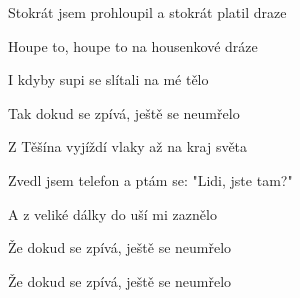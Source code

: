\begin{song}
Stokrát jsem prohloupil a stokrát platil draze    \par
{}Houpe to, houpe to na housenkové dráze    \par
{}I kdyby supi se slítali na mé tělo \par
Tak dokud se zpívá, ještě se neumřelo    \par

\bigskip

Z Těšína vyjíždí vlaky až na kraj světa    \par
{}Zvedl jsem telefon a ptám se: "Lidi, jste tam?"    \par
A z veliké dálky do uší mi zaznělo \par
Že dokud se zpívá, ještě se neumřelo    \par
Že dokud se zpívá, ještě se neumřelo \par

\end{song}
